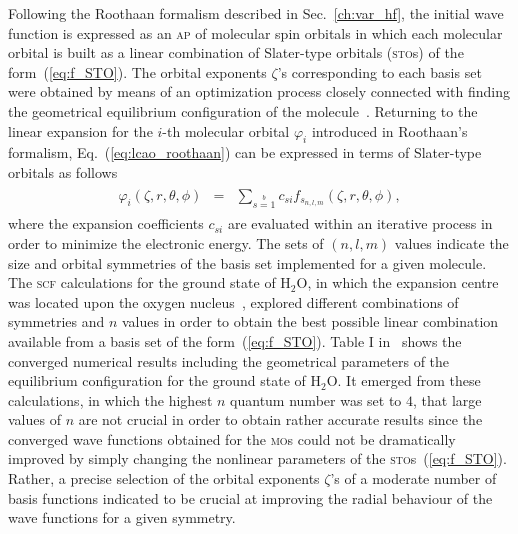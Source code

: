 Following the Roothaan formalism described in Sec.~\ref{ch:var_hf},
the initial wave function is expressed as an \textsc{ap} of molecular
spin orbitals in which each molecular orbital is built as a linear
combination of Slater-type orbitals (\textsc{sto}s) of the
form~(\ref{eq:f_STO}). The orbital exponents $\zeta$'s corresponding
to each basis set were obtained by means of an optimization process
closely connected with finding the geometrical equilibrium
configuration of the
molecule~\cite{Moccia_JCP_2164,Moccia_1964}. Returning to the linear
expansion for the $i$-th molecular orbital $\varphi_{i}$ introduced in
Roothaan's formalism, Eq.~(\ref{eq:lcao_roothaan}) can be expressed in
terms of Slater-type orbitals as follows
%
\begin{eqnarray}
  \begin{split}
    \varphi_{i}(\zeta,r,\theta,\phi) & = &
    \sum\limits_{s=1}\limits^{b} c_{si} f_{s_{n,l,m}}(\zeta,r,\theta,\phi),
  \end{split}
  \label{eq:STO_expansion}
\end{eqnarray}
%
where the expansion coefficients $c_{si}$ are evaluated within an
iterative process in order to minimize the electronic energy. The sets
of $(n,l,m)$ values indicate the size and orbital symmetries of the
basis set implemented for a given molecule.
The \textsc{scf} calculations for the ground state of H$_{2}$O, in
which the expansion centre was located upon the oxygen
nucleus~\cite{Moccia_1964}, explored different combinations of
symmetries and $n$ values in order to obtain the best possible linear
combination available from a basis set of the
form~(\ref{eq:f_STO}). Table I in~\cite{Moccia_1964} shows the
converged numerical results including the geometrical parameters of
the equilibrium configuration for the ground state of H$_{2}$O. It
emerged from these calculations, in which the highest $n$ quantum
number was set to $4$, that large values of $n$ are not crucial in
order to obtain rather accurate results since the converged wave
functions obtained for the \textsc{mo}s could not be dramatically
improved by simply changing the nonlinear parameters of the
\textsc{sto}s~(\ref{eq:f_STO}). Rather, a precise selection of the
orbital exponents $\zeta$'s of a moderate number of basis functions
indicated to be crucial at improving the radial behaviour of the wave
functions for a given symmetry.

